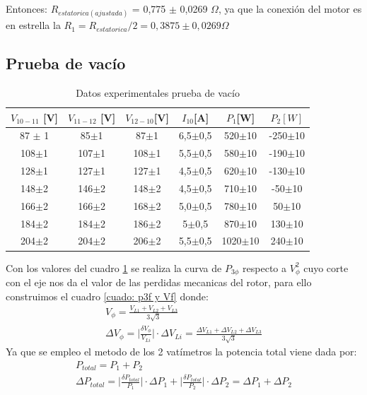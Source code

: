 \documentclass[11pt,letterpaper]{article}     %
\begin{document}
Entonces: $R_{estatorica(ajustada)}$ = 0,775 $\pm$ 0,0269 $\Omega$, ya que la conexión del motor es en estrella la $R_1=R_{estatorica}/2 = 0,3875 \pm 0,0269 \Omega$ 
\subsection{Prueba de vacío}
\begin{table}[h]
	\centering
	\caption{Datos experimentales prueba de vacío}
	\label{tabla:resultadosPruebasVacio}
	\begin{tabular}{|c|c|c|c|c|c|}
		\hline
		\textbf{$V_{10-11}$ [V]} & \textbf{$V_{11-12}$ [V]} & \textbf{$V_{12-10} $[V]} & \textbf{$I_{10} $[A]} & \textbf{$P_1$[W]} & \textbf{$P_2[W]$} \\ \hline
		87 $\pm$ 1 & 85$\pm$1 & 87$\pm$1 & 6,5$\pm$0,5 & 520$\pm$10 & -250$\pm$10 \\ \hline
		108$\pm$1 & 107$\pm$1 & 108$\pm$1 & 5,5$\pm$0,5 & 580$\pm$10 & -190$\pm$10 \\ \hline
		128$\pm$1 & 127$\pm$1 & 127$\pm$1 & 4,5$\pm$0,5 & 620$\pm$10 & -130$\pm$10 \\ \hline
		148$\pm$2 & 146$\pm$2 & 148$\pm$2 & 4,5$\pm$0,5 & 710$\pm$10 & -50$\pm$10 \\ \hline
		166$\pm$2 & 166$\pm$2 & 168$\pm$2 & 5,0$\pm$0,5 & 780$\pm$10 & 50$\pm$10 \\ \hline
		184$\pm$2 & 184$\pm$2 & 186$\pm$2 & 5$\pm$0,5 & 870$\pm$10 & 130$\pm$10 \\ \hline
		204$\pm$2 & 204$\pm$2 & 206$\pm$2 & 5,5$\pm$0,5 & 1020$\pm$10 & 240$\pm$10 \\ \hline
	\end{tabular}
\end{table}
Con los valores del cuadro \ref{tabla:resultadosPruebasVacio} se realiza la curva de $P_{3\phi}$ respecto a $V_{\phi}^2$ cuyo corte con el eje nos da el valor de las perdidas mecanicas del rotor, para ello construimos el cuadro \ref{cuado: p3f y Vf} donde:
\begin{eqnarray}
V_{\phi}=\frac{V_{L1}+V_{L2}+V_{L3}}{3\sqrt{3}}\\
\Delta V_{\phi}= \bigg|\frac{\delta V_{\phi}}{V_{Li}}\bigg| \cdot \Delta V_{Li} = \frac{\Delta V_{L1}+\Delta V_{L2}+\Delta V_{L3}}{3 \sqrt{3}}
\end{eqnarray}
Ya que se empleo el metodo de los 2 vatímetros la potencia total viene dada por:
\begin{eqnarray}
P_{total}=P_1+P_2\\
\Delta P_{total}=  \bigg|\frac{\delta P_{total}}{P_1}\bigg| \cdot \Delta P_1 + \bigg|\frac{\delta P_{total}}{P_2}\bigg| \cdot \Delta P_2 = \Delta P_1 + \Delta P_2
\end{eqnarray}
\end{document}
